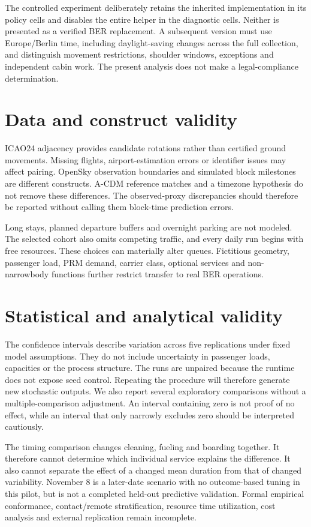 The controlled experiment deliberately retains the inherited implementation in its policy cells and disables the entire helper in the diagnostic cells. Neither is presented as a verified BER replacement. A subsequent version must use Europe/Berlin time, including daylight-saving changes across the full collection, and distinguish movement restrictions, shoulder windows, exceptions and independent cabin work. The present analysis does not make a legal-compliance determination.

\section{Data and construct validity}
ICAO24 adjacency provides candidate rotations rather than certified ground movements. Missing flights, airport-estimation errors or identifier issues may affect pairing. OpenSky observation boundaries and simulated block milestones are different constructs. A-CDM reference matches and a timezone hypothesis do not remove these differences. The observed-proxy discrepancies should therefore be reported without calling them block-time prediction errors.

Long stays, planned departure buffers and overnight parking are not modeled. The selected cohort also omits competing traffic, and every daily run begins with free resources. These choices can materially alter queues. Fictitious geometry, passenger load, PRM demand, carrier class, optional services and non-narrowbody functions further restrict transfer to real BER operations.

\section{Statistical and analytical validity}
The confidence intervals describe variation across five replications under fixed model assumptions. They do not include uncertainty in passenger loads, capacities or the process structure. The runs are unpaired because the runtime does not expose seed control. Repeating the procedure will therefore generate new stochastic outputs. We also report several exploratory comparisons without a multiple-comparison adjustment. An interval containing zero is not proof of no effect, while an interval that only narrowly excludes zero should be interpreted cautiously.

The timing comparison changes cleaning, fueling and boarding together. It therefore cannot determine which individual service explains the difference. It also cannot separate the effect of a changed mean duration from that of changed variability. November 8 is a later-date scenario with no outcome-based tuning in this pilot, but is not a completed held-out predictive validation. Formal empirical conformance, contact/remote stratification, resource time utilization, cost analysis and external replication remain incomplete.

